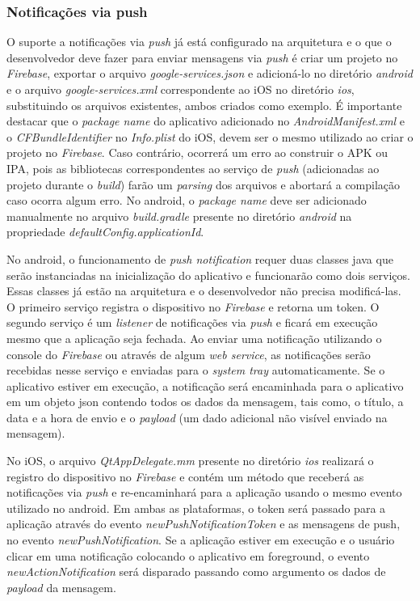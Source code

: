 \subsubsection{Notificações via push}
O suporte a notificações via \textit{push} já está configurado na arquitetura e o que o desenvolvedor deve fazer para enviar mensagens via \textit{push} é criar um projeto no \textit{Firebase}, exportar o arquivo \textit{google-services.json} e adicioná-lo no diretório \textit{android} e o arquivo \textit{google-services.xml} correspondente ao iOS no diretório \textit{ios}, substituindo os arquivos existentes, ambos criados como exemplo. É importante destacar que o \textit{package name} do aplicativo adicionado no \textit{AndroidManifest.xml} e o \textit{CFBundleIdentifier} no \textit{Info.plist} do iOS, devem ser o mesmo utilizado ao criar o projeto no \textit{Firebase}. Caso contrário, ocorrerá um erro ao construir o APK ou IPA, pois as bibliotecas correspondentes ao serviço de \textit{push} (adicionadas ao projeto durante o \textit{build}) farão um \textit{parsing} dos arquivos e abortará a compilação caso ocorra algum erro. No android, o \textit{package name} deve ser adicionado manualmente no arquivo \textit{build.gradle} presente no diretório \textit{android} na propriedade \textit{defaultConfig.applicationId}.\par

No android, o funcionamento de \textit{push notification} requer duas classes java que serão instanciadas na inicialização do aplicativo e funcionarão como dois serviços. Essas classes já estão na arquitetura e o desenvolvedor não precisa modificá-las. O primeiro serviço registra o dispositivo no \textit{Firebase} e retorna um token. O segundo serviço é um \textit{listener} de notificações via \textit{push} e ficará em execução mesmo que a aplicação seja fechada. Ao enviar uma notificação utilizando o console do \textit{Firebase} ou através de algum \textit{web service}, as notificações serão recebidas nesse serviço e enviadas para o \textit{system tray} automaticamente. Se o aplicativo estiver em execução, a notificação será encaminhada para o aplicativo em um objeto json contendo todos os dados da mensagem, tais como, o título, a data e a hora de envio e o \textit{payload} (um dado adicional não visível enviado na mensagem).\par

No iOS, o arquivo \textit{QtAppDelegate.mm} presente no diretório \textit{ios} realizará o registro do dispositivo no \textit{Firebase} e contém um método que receberá as notificações via \textit{push} e re-encaminhará para a aplicação usando o mesmo evento utilizado no android. Em ambas as plataformas, o token será passado para a aplicação através do evento \textit{newPushNotificationToken} e as mensagens de push, no evento \textit{newPushNotification}. Se a aplicação estiver em execução e o usuário clicar em uma notificação colocando o aplicativo em foreground, o evento \textit{newActionNotification} será disparado passando como argumento os dados de \textit{payload} da mensagem.\par

